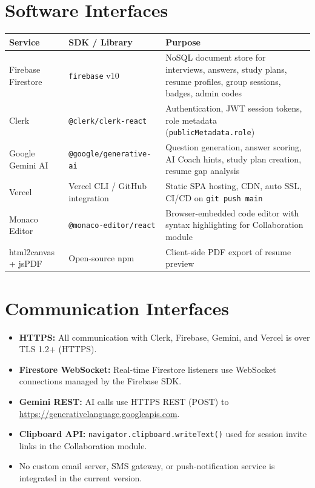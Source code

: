 \documentclass{fisatinternship}
\begin{document}
\section{Software Interfaces}

\begin{longtable}{|p{3cm}|p{3.5cm}|p{5.5cm}|}
\hline
\textbf{Service} & \textbf{SDK / Library} & \textbf{Purpose} \\
\hline
\endhead
Firebase Firestore & \texttt{firebase} v10 & NoSQL document store for interviews,
  answers, study plans, resume profiles, group sessions, badges, admin codes \\
\hline
Clerk & \texttt{@clerk/clerk-react} & Authentication, JWT session tokens,
  role metadata (\texttt{publicMetadata.role}) \\
\hline
Google Gemini AI & \texttt{@google/generative-ai} & Question generation, answer
  scoring, AI Coach hints, study plan creation, resume gap analysis \\
\hline
Vercel & Vercel CLI / GitHub integration & Static SPA hosting, CDN, auto SSL,
  CI/CD on \texttt{git push main} \\
\hline
Monaco Editor & \texttt{@monaco-editor/react} & Browser-embedded code editor with
  syntax highlighting for Collaboration module \\
\hline
html2canvas + jsPDF & Open-source npm & Client-side PDF export of resume preview \\
\hline
\end{longtable}

\section{Communication Interfaces}
\begin{itemize}
  \item \textbf{HTTPS:} All communication with Clerk, Firebase, Gemini, and
        Vercel is over TLS 1.2+ (HTTPS).
  \item \textbf{Firestore WebSocket:} Real-time Firestore listeners use WebSocket
        connections managed by the Firebase SDK.
  \item \textbf{Gemini REST:} AI calls use HTTPS REST (POST) to
        \url{https://generativelanguage.googleapis.com}.
  \item \textbf{Clipboard API:} \texttt{navigator.clipboard.writeText()} used for
        session invite links in the Collaboration module.
  \item No custom email server, SMS gateway, or push-notification service is
        integrated in the current version.
\end{itemize}
\end{document}
